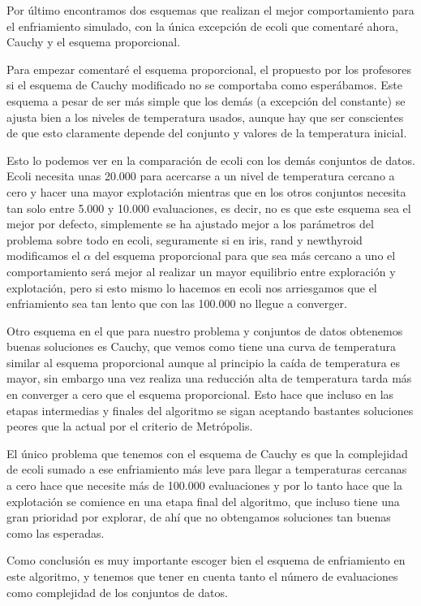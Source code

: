 \documentclass[12pt, spanish]{article}
\begin{document}
Por último encontramos dos esquemas que realizan el mejor comportamiento para el enfriamiento simulado, con la única excepción de ecoli que comentaré ahora, Cauchy y el esquema proporcional.


Para empezar comentaré el esquema proporcional, el propuesto por los profesores si el esquema de Cauchy modificado no se comportaba como esperábamos. Este esquema a pesar de ser más simple que los demás (a excepción del constante) se ajusta bien a los niveles de temperatura usados, aunque hay que ser conscientes de que esto claramente depende del conjunto y valores de la temperatura inicial. 

Esto lo podemos ver en la comparación de ecoli con los demás conjuntos de datos. Ecoli necesita unas 20.000 para acercarse a un nivel de temperatura cercano a cero y hacer una mayor explotación mientras que en los otros conjuntos necesita tan solo entre 5.000 y 10.000 evaluaciones, es decir, no es que este esquema sea el mejor por defecto, simplemente se ha ajustado mejor a los parámetros del problema sobre todo en ecoli, seguramente si en iris, rand y newthyroid modificamos el $\alpha$ del esquema proporcional para que sea más cercano a uno el comportamiento será mejor al realizar un mayor equilibrio entre exploración y explotación, pero si esto mismo lo hacemos en ecoli nos arriesgamos que el enfriamiento sea tan lento que con las 100.000 no llegue a converger.


Otro esquema en el que para nuestro problema y conjuntos de datos obtenemos buenas soluciones es Cauchy, que vemos como tiene una curva de temperatura similar al esquema proporcional aunque al principio la caída de temperatura es mayor, sin embargo una vez realiza una reducción alta de temperatura tarda más en converger a cero que el esquema proporcional. Esto hace que incluso en las etapas intermedias y finales del algoritmo se sigan aceptando bastantes soluciones peores que la actual por el criterio de Metrópolis.

El único problema que tenemos con el esquema de Cauchy es que la complejidad de ecoli sumado a ese enfriamiento más leve para llegar a temperaturas cercanas a cero hace que necesite más de  100.000 evaluaciones y por lo tanto hace que la explotación se comience en una etapa final del algoritmo, que incluso tiene una gran prioridad por explorar, de ahí que no obtengamos soluciones tan buenas como las esperadas.


Como conclusión es muy importante escoger bien el esquema de enfriamiento en este algoritmo, y tenemos que tener en cuenta tanto el número de evaluaciones como complejidad de los conjuntos de datos. 
\end{document}
